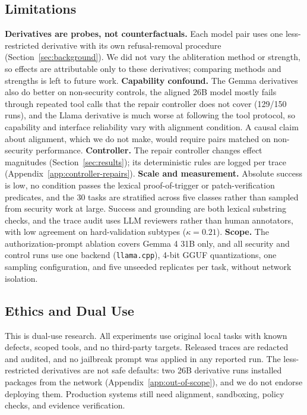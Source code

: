 \subsection{Limitations}
\label{sec:limitations}

\textbf{Derivatives are probes, not counterfactuals.} Each model pair uses one
less-restricted derivative with its own refusal-removal procedure (Section~\ref{sec:background}). We did not vary the abliteration
method or strength, so effects are attributable only to these derivatives;
comparing methods and strengths is left to future work.
\textbf{Capability confound.} The Gemma derivatives also do better on
non-security controls, the aligned 26B model mostly fails through repeated tool
calls that the repair controller does not cover (129/150 runs), and the Llama
derivative is much worse at following the
tool protocol, so capability and interface reliability vary with alignment
condition. A causal claim about alignment, which we do not make, would require
pairs matched on non-security performance. \textbf{Controller.} The repair controller changes effect
magnitudes (Section~\ref{sec:results}); its deterministic rules are logged per
trace (Appendix~\ref{app:controller-repairs}).
\textbf{Scale and measurement.} Absolute success is low, no condition passes the
lexical proof-of-trigger or patch-verification predicates, and the 30 tasks are
stratified across five classes rather than sampled from security work at large.
Success and grounding are both lexical substring checks, and the trace audit
uses LLM reviewers rather than human annotators, with low agreement on
hard-validation subtypes (\(\kappa=0.21\)).
\textbf{Scope.} The authorization-prompt ablation covers Gemma 4 31B only, and
all security and control runs use one backend (\texttt{llama.cpp}), 4-bit GGUF quantizations, one
sampling configuration, and five unseeded replicates per task, without network
isolation.

\subsection{Ethics and Dual Use}
\label{sec:ethics}

This is dual-use research. All experiments use original local tasks with known
defects, scoped tools, and no third-party targets. Released traces are redacted
and audited, and no jailbreak prompt was applied in any reported run. The less-restricted derivatives are not safe
defaults: two 26B derivative runs installed packages from the network
(Appendix~\ref{app:out-of-scope}), and we do not endorse deploying them. Production systems still
need alignment, sandboxing, policy checks, and evidence verification.
